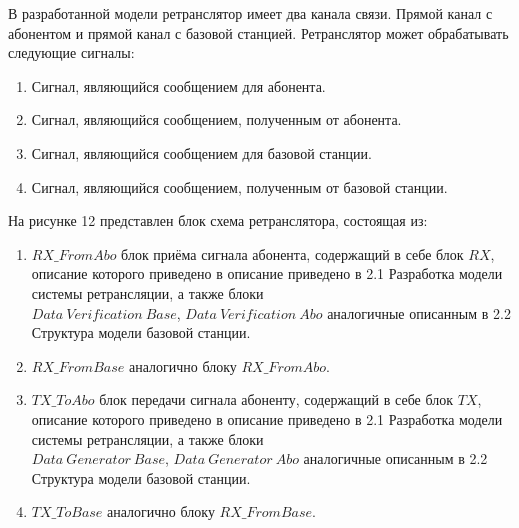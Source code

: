 \begin{onehalfspace}


В разработанной модели ретранслятор имеет два канала связи. Прямой канал с абонентом и прямой канал с базовой станцией. Ретранслятор может обрабатывать следующие сигналы: 


\begin{enumerate} 	
	\item Сигнал, являющийся сообщением для абонента.

        \item Сигнал, являющийся сообщением, полученным от абонента.

        \item Сигнал, являющийся сообщением для базовой станции.

        \item Сигнал, являющийся сообщением, полученным от базовой станции.
\end{enumerate}


На рисунке 12 представлен блок схема ретранслятора, состоящая из: 

\begin{enumerate} 	
	\item $RX\_FromAbo$ блок приёма сигнала абонента, содержащий в себе блок $RX$, описание которого приведено в описание приведено в 2.1 Разработка модели системы ретрансляции, а также блоки \\ $Data \ Verification \ Base$, $Data \ Verification \ Abo$ аналогичные описанным в 2.2 Структура модели базовой станции. 
	
	\item  $RX\_FromBase$ аналогично блоку $RX\_FromAbo$.
	
	\item  $TX\_ToAbo$ блок передачи сигнала абоненту, содержащий в себе блок $TX$, описание которого приведено в описание приведено в 2.1 Разработка модели системы ретрансляции, а также блоки \\ $Data \  Generator \ Base$, $Data \  Generator \ Abo$ аналогичные описанным в 2.2 Структура модели базовой станции.

        \item  $TX\_ToBase$ аналогично блоку $RX\_FromBase$.
        
\end{enumerate}
\end{onehalfspace}


